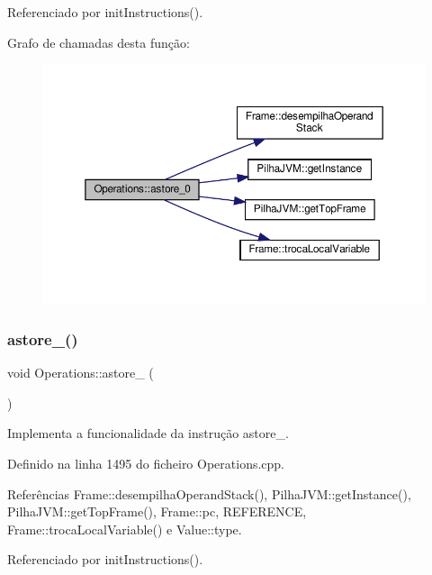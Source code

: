 Referenciado por init\+Instructions().

Grafo de chamadas desta função\+:
\nopagebreak
\begin{figure}[H]
\begin{center}
\leavevmode
\includegraphics[width=350pt]{classOperations_a140f2e8501424f8a73dbfecfa3ca859f_cgraph}
\end{center}
\end{figure}
\mbox{\label{classOperations_a1a7a41be018313dd524df5327c8b6035}} 
\subsubsection{\texorpdfstring{astore\+\_()}{astore\_1()}}
{\footnotesize\ttfamily void Operations\+::astore\+\_ (\begin{DoxyParamCaption}{ }\end{DoxyParamCaption})\hspace{0.3cm}{\ttfamily [private]}}



Implementa a funcionalidade da instrução astore\+\_. 



Definido na linha 1495 do ficheiro Operations.\+cpp.



Referências Frame\+::desempilha\+Operand\+Stack(), Pilha\+J\+V\+M\+::get\+Instance(), Pilha\+J\+V\+M\+::get\+Top\+Frame(), Frame\+::pc, R\+E\+F\+E\+R\+E\+N\+CE, Frame\+::troca\+Local\+Variable() e Value\+::type.



Referenciado por init\+Instructions().


